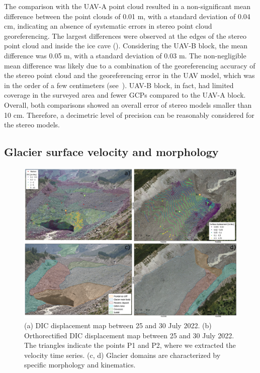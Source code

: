 The comparison with the UAV-A point cloud resulted in a non-significant mean difference between the point clouds of 0.01 m, with a standard deviation of 0.04 cm, indicating an absence of systematic errors in stereo point cloud georeferencing. 
The largest differences were observed at the edges of the stereo point cloud and inside the ice cave ().
Considering the UAV-B block, the mean difference was 0.05 m, with a standard deviation of 0.03 m.
The non-negligible mean difference was likely due to a combination of the georeferencing accuracy of the stereo point cloud and the georeferencing error in the UAV model, which was in the order of a few centimeters (see~).
UAV-B block, in fact, had limited coverage in the surveyed area and fewer GCPs compared to the UAV-A block.
Overall, both comparisons showed an overall error of stereo models smaller than 10 cm.
Therefore, a decimetric level of precision can be reasonably considered for the stereo models.

\subsection{Glacier surface velocity and morphology}\label{sec:4:res_velocity}

\begin{figure}[ht]
  \includegraphics[width=\textwidth]{4_dic_composition.png}
  \caption{(a) DIC displacement map between 25 and 30 July 2022. (b) Orthorectified DIC
    displacement map between 25 and 30 July 2022. The triangles indicate the points P1
    and P2, where we extracted the velocity time series.
    (c, d) Glacier domains are characterized by specific morphology and kinematics.}
  \label{fig:4:dic_results}
\end{figure}

